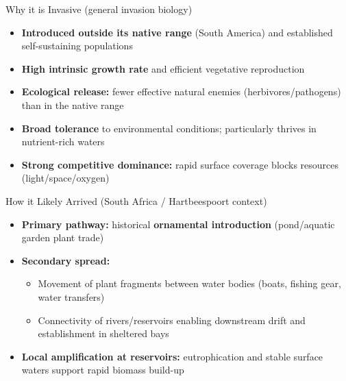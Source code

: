 \begin{frame}{Why it is Invasive (general invasion biology)}
\small
\begin{itemize}
  \item \textbf{Introduced outside its native range} (South America) and established self-sustaining populations
  \item \textbf{High intrinsic growth rate} and efficient vegetative reproduction
  \item \textbf{Ecological release:} fewer effective natural enemies (herbivores/pathogens) than in the native range
  \item \textbf{Broad tolerance} to environmental conditions; particularly thrives in nutrient-rich waters
  \item \textbf{Strong competitive dominance:} rapid surface coverage blocks resources (light/space/oxygen)
\end{itemize}
\end{frame}

\begin{frame}{How it Likely Arrived (South Africa / Hartbeespoort context)}
\small
\begin{itemize}
  \item \textbf{Primary pathway:} historical \textbf{ornamental introduction} (pond/aquatic garden plant trade)
  \item \textbf{Secondary spread:}
    \begin{itemize}
      \item Movement of plant fragments between water bodies (boats, fishing gear, water transfers)
      \item Connectivity of rivers/reservoirs enabling downstream drift and establishment in sheltered bays
    \end{itemize}
  \item \textbf{Local amplification at reservoirs:} eutrophication and stable surface waters support rapid biomass build-up
\end{itemize}
\end{frame}

